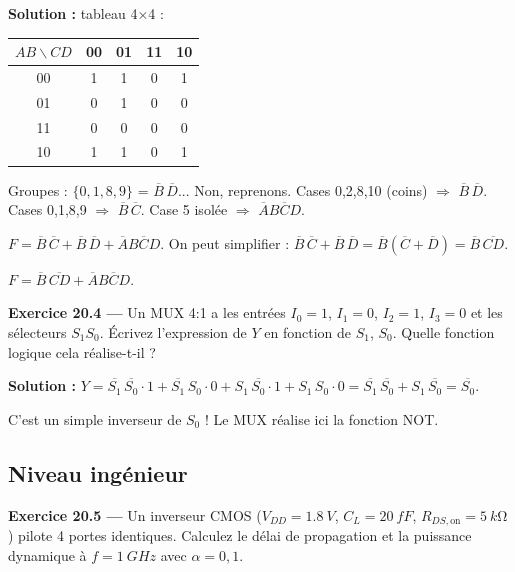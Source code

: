 \documentclass[12pt,a4paper,twoside]{book}
\begin{document}
\begin{pratique}
\textbf{Solution :} tableau 4$\times$4 :

\begin{center}
\begin{tabular}{c|cccc}
$AB \backslash CD$ & 00 & 01 & 11 & 10 \\
\hline
00 & 1 & 1 & 0 & 1 \\
01 & 0 & 1 & 0 & 0 \\
11 & 0 & 0 & 0 & 0 \\
10 & 1 & 1 & 0 & 1 \\
\end{tabular}
\end{center}

Groupes : $\{0,1,8,9\}$ = $\overline{B}\,\overline{D}$... Non, reprenons. Cases 0,2,8,10 (coins) $\Rightarrow$ $\overline{B}\,\overline{D}$. Cases 0,1,8,9 $\Rightarrow$ $\overline{B}\,\overline{C}$. Case 5 isolée $\Rightarrow$ $\overline{A}B\overline{C}D$.

$F = \overline{B}\,\overline{C} + \overline{B}\,\overline{D} + \overline{A}B\overline{C}D$. On peut simplifier : $\overline{B}\,\overline{C} + \overline{B}\,\overline{D} = \overline{B}(\overline{C}+\overline{D}) = \overline{B}\,\overline{CD}$.

$F = \overline{B}\,\overline{CD} + \overline{A}B\overline{C}D$.
\end{pratique}

\textbf{Exercice 20.4 ---} Un MUX 4:1 a les entrées $I_0 = 1$, $I_1 = 0$, $I_2 = 1$, $I_3 = 0$ et les sélecteurs $S_1 S_0$. Écrivez l'expression de $Y$ en fonction de $S_1$, $S_0$. Quelle fonction logique cela réalise-t-il ?

\begin{pratique}
\textbf{Solution :} $Y = \overline{S_1}\,\overline{S_0}\cdot 1 + \overline{S_1}\,S_0 \cdot 0 + S_1\,\overline{S_0}\cdot 1 + S_1\,S_0\cdot 0 = \overline{S_1}\,\overline{S_0} + S_1\,\overline{S_0} = \overline{S_0}$.

C'est un simple inverseur de $S_0$ ! Le MUX réalise ici la fonction NOT.
\end{pratique}

\subsection*{Niveau ingénieur}

\textbf{Exercice 20.5 ---} Un inverseur CMOS ($V_{DD} = \SI{1.8}{V}$, $C_L = \SI{20}{fF}$, $R_{DS,\text{on}} = \SI{5}{k\ohm}$) pilote 4 portes identiques. Calculez le délai de propagation et la puissance dynamique à $f = \SI{1}{GHz}$ avec $\alpha = 0{,}1$.
\end{document}
